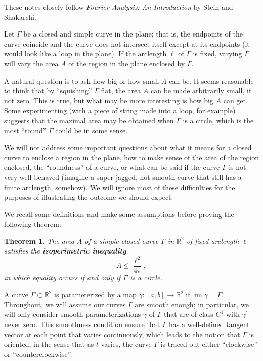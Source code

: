 \documentclass[11pt,leqno]{article}
\theoremstyle{plain}
\newtheorem{theorem}[lem]{Theorem}
\theoremstyle{definition}
\numberwithin{equation}{section}
\numberwithin{lem}{section}
\DeclareMathOperator{\im}{im}
\begin{document}
These notes closely follow \textit{Fourier Analysis: An Introduction} by Stein and Shakarchi.

Let $\Gamma$ be a closed and simple curve in the plane; that is, the endpoints of the curve coincide and the curve does not intersect itself except at its endpoints (it would look like a loop in the plane). If the arclength $\ell$ of $\Gamma$ is fixed, varying $\Gamma$ will vary the area $A$ of the region in the plane enclosed by $\Gamma$.

A natural question is to ask how big or how small $A$ can be. It seems reasonable to think that by ``squishing'' $\Gamma$ flat, the area $A$ can be made arbitrarily small, if not zero. This is true, but what may be more interesting is how big $A$ can get. Some experimenting (with a piece of string made into a loop, for example) suggests that the maximal area may be obtained when $\Gamma$ is a circle, which is the most ``round'' $\Gamma$ could be in some sense.

We will not address some important questions about what it means for a closed curve to enclose a region in the plane, how to make sense of the area of the region enclosed, the ``roundness'' of a curve, or what can be said if the curve $\Gamma$ is not very well behaved (imagine a super jagged, not-smooth curve that still has a finite arclength, somehow). We will ignore most of these difficulties for the purposes of illustrating the outcome we should expect. 

We recall some definitions and make some assumptions before proving the following theorem: 
\begin{theorem}
    The area $A$ of a simple closed curve $\Gamma$ in $\mathbb R^2$ of fixed arclength $\ell$ satisfies the \textbf{isoperimetric inequality} 
    \[A\leq \frac{\ell^2}{4\pi},\]
    in which equality occurs if and only if $\Gamma$ is a circle.
\end{theorem}
A curve $\Gamma\subset \mathbb R^2$ is parameterized by a map $\gamma\colon [a,b]\to\mathbb R^2$ if $\im\gamma = \Gamma$. Throughout, we will assume our curves $\Gamma$ are smooth enough; in particular, we will only consider smooth parameterizations $\gamma$ of $\Gamma$ that are of class $C^1$ with $\gamma^\prime$ never zero. This smoothness condition ensure that $\Gamma$ has a well-defined tangent vector at each point that varies continuously, which leads to the notion that $\Gamma$ is oriented, in the sense that as $t$ varies, the curve $\Gamma$ is traced out either ``clockwise'' or ``counterclockwise''.
\end{document}
